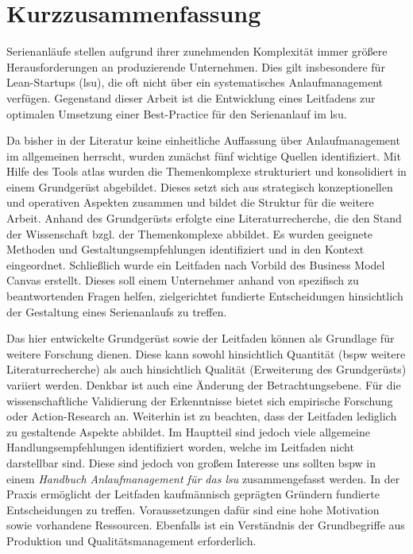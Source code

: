 \chapter*{Kurzzusammenfassung}
Serienanläufe stellen aufgrund ihrer zunehmenden Komplexität immer größere Herausforderungen an produzierende Unternehmen. Dies gilt insbesondere für Lean-Startups (\gls{lsu}), die oft nicht über ein systematisches Anlaufmanagement verfügen.
Gegenstand dieser Arbeit ist die Entwicklung eines Leitfadens zur optimalen Umsetzung einer Best-Practice für den Serienanlauf im \gls{lsu}.

Da bisher in der Literatur keine einheitliche Auffassung über Anlaufmanagement im allgemeinen herrscht, wurden zunächst fünf wichtige Quellen identifiziert. Mit Hilfe des Tools \gls{atlas} wurden die Themenkomplexe strukturiert und konsolidiert in einem Grundgerüst abgebildet. Dieses setzt sich aus strategisch konzeptionellen und operativen Aspekten zusammen und bildet die Struktur für die weitere Arbeit. 
Anhand des Grundgerüsts erfolgte eine Literaturrecherche, die den Stand der Wissenschaft bzgl. der Themenkomplexe abbildet. Es wurden geeignete Methoden und Gestaltungsempfehlungen identifiziert und in den Kontext eingeordnet. 
Schließlich wurde ein Leitfaden nach Vorbild des Business Model Canvas erstellt. Dieses soll einem Unternehmer anhand von spezifisch zu beantwortenden Fragen helfen, zielgerichtet fundierte Entscheidungen hinsichtlich der Gestaltung eines Serienanlaufs zu treffen. 
% 

Das hier entwickelte Grundgerüst sowie der Leitfaden können als Grundlage für weitere Forschung dienen. Diese kann sowohl hinsichtlich Quantität (\gls{bspw} weitere Literaturrecherche) als auch hinsichtlich Qualität (Erweiterung des Grundgerüsts) variiert werden. Denkbar ist auch eine Änderung der Betrachtungsebene. Für die wissenschaftliche Validierung der Erkenntnisse bietet sich empirische Forschung oder Ac­tion-Re­search an. 
Weiterhin ist zu beachten, dass der Leitfaden lediglich zu gestaltende Aspekte abbildet. Im Hauptteil sind jedoch viele allgemeine Handlungsempfehlungen identifiziert worden, welche im Leitfaden nicht darstellbar sind. Diese sind jedoch von großem Interesse uns sollten \gls{bspw} in einem \textit{Handbuch Anlaufmanagement für das \gls{lsu}} zusammengefasst werden.
% 
In der Praxis ermöglicht der Leitfaden kaufmännisch geprägten Gründern fundierte Entscheidungen zu treffen. Voraussetzungen dafür sind eine hohe Motivation sowie vorhandene Ressourcen. Ebenfalls ist ein Verständnis der Grundbegriffe aus Produktion und Qualitätsmanagement erforderlich. 
